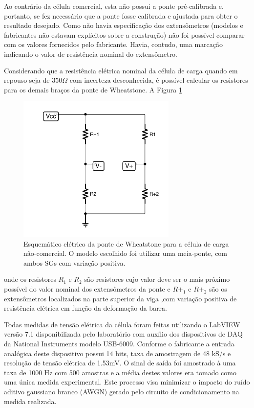 \documentclass[a4paper]{instrumentacao}
\begin{document}
Ao contrário da célula comercial, esta não possui a ponte pré-calibrada e, portanto, se fez necessário que a ponte fosse calibrada e ajustada para obter o resultado desejado. Como não havia especificação dos extensômetros (modelos e fabricantes não estavam explícitos sobre a construção) não foi possível comparar com os valores fornecidos pelo fabricante. Havia, contudo, uma marcação indicando o valor de resistência nominal do extensômetro.

Considerando que a resistência elétrica nominal da célula de carga quando em repouso seja de $350 \Omega$ com incerteza desconhecida, é possível calcular os resistores para os demais braços da ponte de Wheatstone. A Figura \ref{fig:celula-nao-comercial-ponte}

\begin{figure}[H]
\center
\includegraphics[width=0.7\textwidth]{WheatstoneNaoComercial.pdf}
\caption{Esquemático elétrico da ponte de Wheatstone para a célula de carga não-comercial. O modelo escolhido foi utilizar uma meia-ponte, com ambos SGs com variação positiva.}
\label{fig:celula-nao-comercial-ponte}
\end{figure}

\noindent onde os resistores $R_1$ e $R_2$ são resistores cujo valor deve ser o mais próximo possível do valor nominal dos extensômetros da ponte e $R+_1$ e $R+_2$ são os extensômetros localizados na parte superior da viga ,com variação positiva de resistência elétrica em função da deformação da barra.

Todas medidas de tensão elétrica da célula foram feitas utilizando o LabVIEW versão 7.1 disponibilizada pelo laboratório com auxílio dos dispositivos de DAQ da National Instruments modelo USB-6009. Conforme o fabricante \cite{daq-specifications} a entrada analógica deste dispositivo possui 14 bits, taxa de amostragem de 48 kS/s e resolução de tensão elétrica de 1.53mV. O sinal de saída foi amostrado à uma taxa de 1000 Hz com 500 amostras e a média destes valores era tomado como uma única medida experimental. Este processo visa minimizar o impacto do ruído aditivo gaussiano branco (AWGN) gerado pelo circuito de condicionamento na medida realizada.
\end{document}
